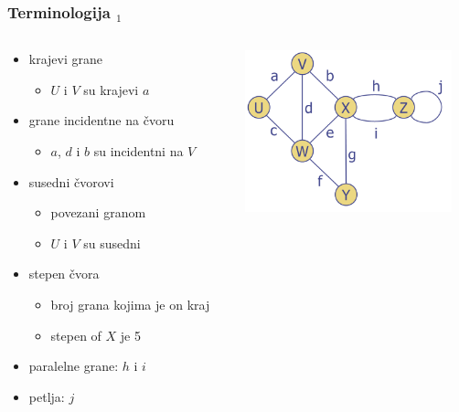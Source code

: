 \documentclass[compress,aspectratio=169]{beamer}
\begin{document}
\begin{frame}[fragile]
  \frametitle{Terminologija $_{1}$}
  \begin{columns}
    \begin{column}[t]{6cm}
      \begin{itemize}
        \item krajevi grane
        \begin{itemize}
          \item $U$ i $V$ su krajevi $a$
        \end{itemize}
        \item grane incidentne na čvoru
        \begin{itemize}
          \item $a$, $d$ i $b$ su incidentni na $V$
        \end{itemize}
        \item susedni čvorovi
        \begin{itemize}
          \item povezani granom
          \item $U$ i $V$ su susedni
        \end{itemize}
        \item stepen čvora
        \begin{itemize}
          \item broj grana kojima je on kraj
          \item stepen of $X$ je 5
        \end{itemize}
        \item paralelne grane: $h$ i $i$
        \item petlja: $j$
      \end{itemize}
    \end{column}
    \begin{column}[t]{6cm}
      \begin{center}
        \includegraphics[width=6cm]{asp-14-pic04.png}
      \end{center}
    \end{column}
  \end{columns}
\end{frame}
\end{document}

